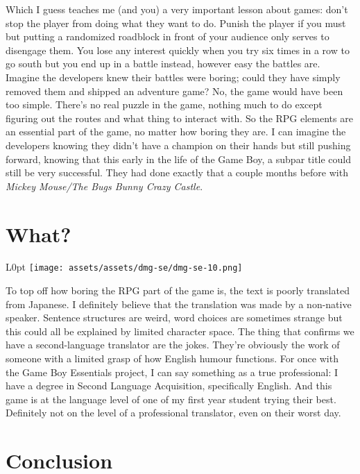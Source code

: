 \documentclass{book}
\begin{document}
Which I guess teaches me (and you) a very important lesson about games: don’t stop the player from doing what they want to do. Punish the player if you must but putting a randomized roadblock in front of your audience only serves to disengage them. You lose any interest quickly when you try six times in a row to go south but you end up in a battle instead, however easy the battles are. Imagine the developers knew their battles were boring; could they have simply removed them and shipped an adventure game? No, the game would have been too simple. There’s no real puzzle in the game, nothing much to do except figuring out the routes and what thing to interact with. So the RPG elements are an essential part of the game, no matter how boring they are. I can imagine the developers knowing they didn’t have a champion on their hands but still pushing forward, knowing that this early in the life of the Game Boy, a subpar title could still be very successful. They had done exactly that a couple months before with \emph{Mickey Mouse/The Bugs Bunny Crazy Castle}.

\FloatBarrier\needspace{10mm}\section*{What?}\nopagebreak[4]

\begin{wrapfigure}{L}{0pt} \texttt{[image: assets/assets/dmg-se/dmg-se-10.png]}\end{wrapfigure}
To top off how boring the RPG part of the game is, the text is poorly translated from Japanese. I definitely believe that the translation was made by a non-native speaker. Sentence structures are weird, word choices are sometimes strange but this could all be explained by limited character space. The thing that confirms we have a second-language translator are the jokes. They’re obviously the work of someone with a limited grasp of how English humour functions. For once with the Game Boy Essentials project, I can say something as a true professional: I have a degree in Second Language Acquisition, specifically English. And this game is at the language level of one of my first year student trying their best. Definitely not on the level of a professional translator, even on their worst day.

\FloatBarrier\needspace{10mm}\section*{Conclusion}\nopagebreak[4]
\end{document}
